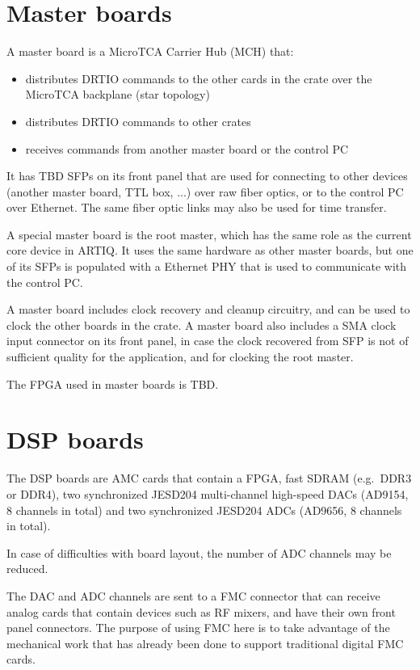 \documentclass[11pt]{paper}
\begin{document}
\section{Master boards}
A master board is a MicroTCA Carrier Hub (MCH) that:
\begin{itemize}
\item distributes DRTIO commands to the other cards in the crate over the MicroTCA backplane (star topology)
\item distributes DRTIO commands to other crates
\item receives commands from another master board or the control PC
\end{itemize}

It has TBD SFPs on its front panel that are used for connecting to other devices (another master board, TTL box, ...) over raw fiber optics, or to the control PC over Ethernet. The same fiber optic links may also be used for time transfer.

A special master board is the root master, which has the same role as the current core device in ARTIQ. It uses the same hardware as other master boards, but one of its SFPs is populated with a Ethernet PHY that is used to communicate with the control PC.

A master board includes clock recovery and cleanup circuitry, and can be used to clock the other boards in the crate. A master board also includes a SMA clock input connector on its front panel, in case the clock recovered from SFP is not of sufficient quality for the application, and for clocking the root master.

The FPGA used in master boards is TBD.

\section{DSP boards}
The DSP boards are AMC cards that contain a FPGA, fast SDRAM (e.g.\ DDR3 or DDR4), two synchronized JESD204 multi-channel high-speed DACs (AD9154, 8 channels in total) and two synchronized JESD204 ADCs (AD9656, 8 channels in total).

In case of difficulties with board layout, the number of ADC channels may be reduced.

The DAC and ADC channels are sent to a FMC connector that can receive analog cards that contain devices such as RF mixers, and have their own front panel connectors. The purpose of using FMC here is to take advantage of the mechanical work that has already been done to support traditional digital FMC cards.
\end{document}
